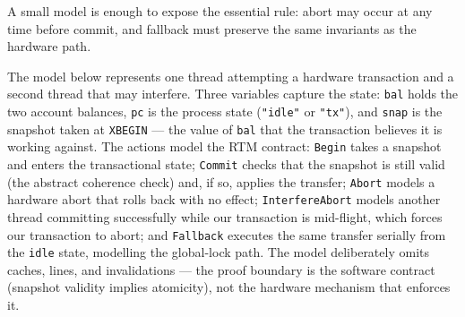 A small model is enough to expose the essential rule: abort may occur at any time before commit, and fallback must preserve the same invariants as the hardware path.

The model below represents one thread attempting a hardware transaction and a second thread that may interfere. Three variables capture the state: \texttt{bal} holds the two account balances, \texttt{pc} is the process state (\texttt{"idle"} or \texttt{"tx"}), and \texttt{snap} is the snapshot taken at \texttt{XBEGIN} --- the value of \texttt{bal} that the transaction believes it is working against. The actions model the RTM contract: \texttt{Begin} takes a snapshot and enters the transactional state; \texttt{Commit} checks that the snapshot is still valid (the abstract coherence check) and, if so, applies the transfer; \texttt{Abort} models a hardware abort that rolls back with no effect; \texttt{InterfereAbort} models another thread committing successfully while our transaction is mid-flight, which forces our transaction to abort; and \texttt{Fallback} executes the same transfer serially from the \texttt{idle} state, modelling the global-lock path. The model deliberately omits caches, lines, and invalidations --- the proof boundary is the software contract (snapshot validity implies atomicity), not the hardware mechanism that enforces it.

